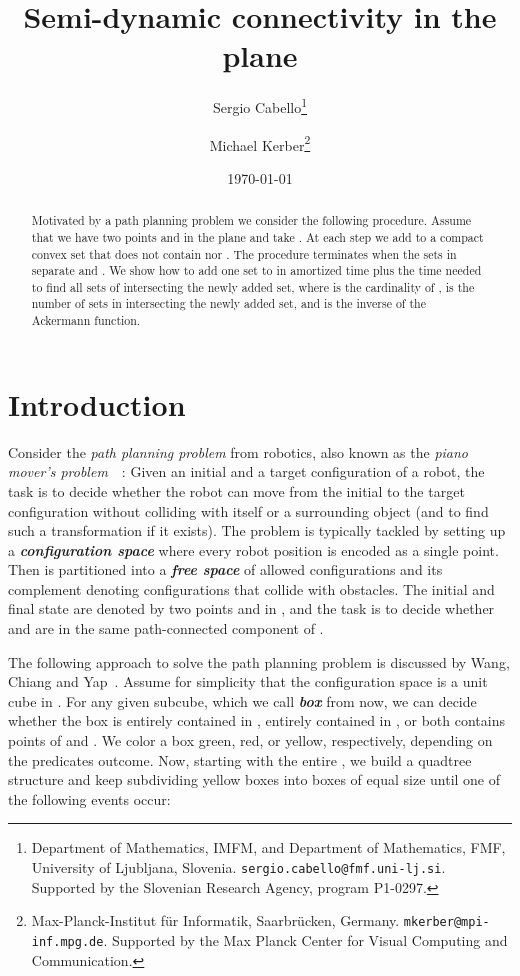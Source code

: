 \documentclass[a4paper,11pt]{article}
\title{Semi-dynamic connectivity in the plane}
\author{
	Sergio Cabello\thanks{Department of Mathematics, IMFM, and
			Department of Mathematics, FMF, University of Ljubljana, Slovenia.
			\texttt{sergio.cabello@fmf.uni-lj.si}.
        	Supported by the Slovenian Research Agency, program P1-0297.}
\and
	Michael Kerber\thanks{Max-Planck-Institut f\"ur Informatik, Saarbr\"ucken, Germany.
                              \texttt{mkerber@mpi-inf.mpg.de}.
                              Supported by the Max Planck Center for Visual Computing and Communication.}
}
\date{\today}
\def\DEF#1{\textbf{\emph{#1}}}
\begin{document}
\maketitle

\begin{abstract}
	Motivated by a path planning problem we consider the following procedure.
	Assume that we have two points  and  in the plane and take .
	At each step we add to  a compact convex set that does not
	contain  nor .
	The procedure terminates when the sets in  separate  and .
	We show how to add one set to 
	in  amortized time plus the time needed 
	to find all sets of  intersecting the newly added set,
	where  is the cardinality of ,
	 is the number of sets in  intersecting the newly added set, and 
	 is the inverse of the Ackermann function.
\end{abstract}


\section{Introduction}

Consider the \emph{path planning problem} from robotics, 
also known as the \emph{piano mover's problem}~\cite{lavalle}~\cite[Ch.13]{dutchbook}:
Given an initial and a target configuration of a robot, the task
is to decide whether the robot can move from the initial to the target
configuration without colliding with itself or a surrounding object
(and to find such a transformation if it exists).
The problem is typically tackled by setting up a \DEF{configuration space} 
where every robot position is encoded as a single point.
Then  is partitioned into a \DEF{free space}  
of allowed configurations and its complement 
 denoting configurations
that collide with obstacles. The initial and final state are denoted by two points 
and  in , and the task is to decide whether  and  are in the same
path-connected component of .

The following approach to solve the path planning problem
is discussed by Wang, Chiang and Yap~\cite{wcy-soft}. 
Assume for simplicity
that the configuration space  is a unit cube in .
For any given subcube, which we call \DEF{box} from now, we can decide whether the box 
is entirely contained in , entirely contained in ,
or both contains points of  and . We color a box
green, red, or yellow, respectively, depending on the predicates outcome.
Now, starting with the entire , we build a quadtree structure
and keep subdividing yellow boxes
into  boxes of equal size until one of the following events occur:
\end{document}
